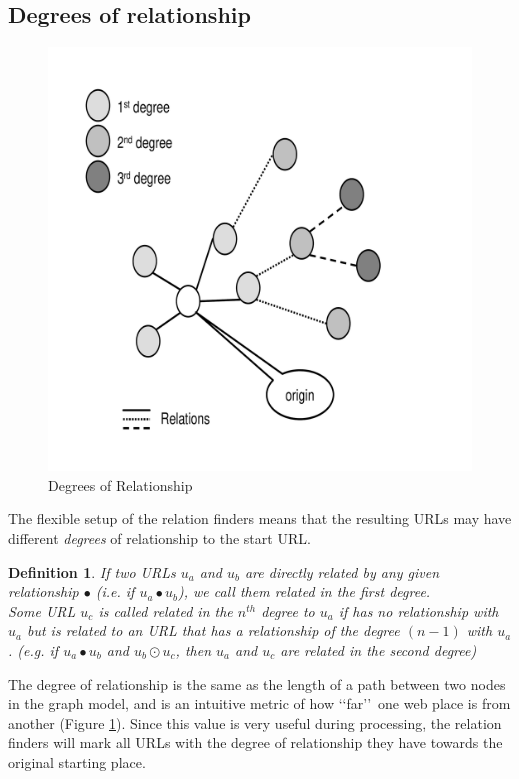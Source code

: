 \documentclass[a4paper]{danarticle}
\newtheorem{definition}{Definition}
\theoremstyle{remark}
\begin{document}
     \subsection{Degrees of relationship}
       \begin{figure}[ht]
       \centering
	 \includegraphics[width=12cm]{degrees}
	 \caption{Degrees of Relationship}
	 \label{degrees}
       \end{figure}
       The flexible setup of the relation finders means that the resulting 
       URLs may have different \textit{degrees} of relationship to the start 
       URL. 
       \begin{definition}
       If two URLs $ u_a $ and $ u_b $ are directly related by any given
       relationship $ \bullet $ (i.e. if $ u_a \bullet u_b $), 
       we call them related in the first degree.\\
       Some URL $ u_c $ is called related in the $ n^{th} $ degree to $ u_a $ if
       has no relationship with $ u_a $  but is related to an URL that 
       has a relationship of the degree $ (n-1) $ with $ u_a $. (e.g. if 
       $ u_a \bullet u_b$ and $ u_b \odot u_c $, then $ u_a $ and $ u_c $ are
       related in the second degree)
       \end{definition}
       The degree of relationship is the same as the length of a path between 
       two nodes in the graph model, and is an intuitive metric of how 
       \lq\lq far\rq\rq\ one web place is from another (Figure \ref{degrees}). 
       Since this value is very 
       useful during processing, the relation finders will mark all URLs with the 
       degree of relationship they have towards the original starting place.
\end{document}
